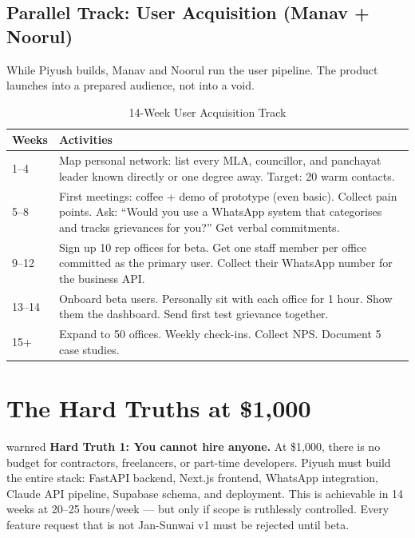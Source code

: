 \documentclass[12pt, a4paper]{article}
\begin{document}
\vspace{0.5em}

\subsection{Parallel Track: User Acquisition (Manav + Noorul)}

While Piyush builds, Manav and Noorul run the user pipeline. The product launches into a prepared audience, not into a void.

\begin{table}[ht]
\centering
\caption{14-Week User Acquisition Track}
\renewcommand{\arraystretch}{1.4}
\begin{tabularx}{\textwidth}{p{2cm} X}
\toprule
\rowcolor{pollitylightblue}
\textbf{Weeks} & \textbf{Activities} \\
\midrule
1--4   & Map personal network: list every MLA, councillor, and panchayat leader known directly or one degree away. Target: 20 warm contacts. \\
\midrule
5--8   & First meetings: coffee + demo of prototype (even basic). Collect pain points. Ask: ``Would you use a WhatsApp system that categorises and tracks grievances for you?'' Get verbal commitments. \\
\midrule
9--12  & Sign up 10 rep offices for beta. Get one staff member per office committed as the primary user. Collect their WhatsApp number for the business API. \\
\midrule
13--14 & Onboard beta users. Personally sit with each office for 1 hour. Show them the dashboard. Send first test grievance together. \\
\midrule
15+    & Expand to 50 offices. Weekly check-ins. Collect NPS. Document 5 case studies. \\
\bottomrule
\end{tabularx}
\end{table}

\newpage

\section{The Hard Truths at \$1,000}

\begin{insightbox}{warnred}
\textbf{Hard Truth 1: You cannot hire anyone.}
At \$1,000, there is no budget for contractors, freelancers, or part-time developers.
Piyush must build the entire stack: FastAPI backend, Next.js frontend, WhatsApp
integration, Claude API pipeline, Supabase schema, and deployment. This is achievable
in 14 weeks at 20--25 hours/week --- but only if scope is ruthlessly controlled.
Every feature request that is not Jan-Sunwai v1 must be rejected until beta.
\end{insightbox}
\end{document}
